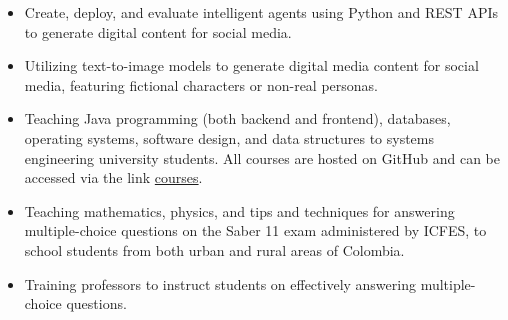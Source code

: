 \documentclass[10pt,letter,ragged2e,withhyper]{altacv}
\begin{document}
\begin{paracol}{2}

\begin{itemize}
	\item Create, deploy, and evaluate intelligent agents using Python and REST APIs to generate digital content for social media.
\end{itemize}

\divider


\begin{itemize}
\item Utilizing text-to-image models to generate digital media content for social media, featuring fictional characters or non-real personas.
\end{itemize}

\divider

\begin{itemize}
\item Teaching Java programming (both backend and frontend), databases, operating systems, software design, and data structures to systems engineering university students. All courses are hosted on GitHub and can be accessed via the link \href{https://saguileran.github.io/courses/}{courses}.
\end{itemize}

\divider


\begin{itemize}
	\item Teaching mathematics, physics, and tips and techniques for answering multiple-choice questions on the Saber 11 exam administered by ICFES, to school students from both urban and rural areas of Colombia.
	\item Training professors to instruct students on effectively answering multiple-choice questions.
\end{itemize}

\divider


\end{paracol}
\end{document}
